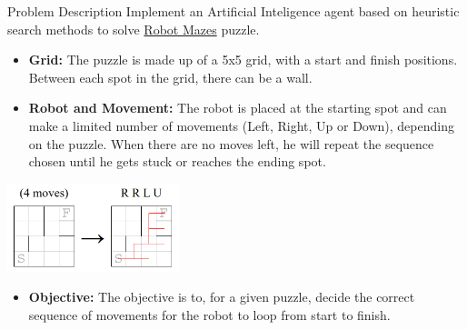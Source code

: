 
\begin{frame}{Problem Description}
    Implement an Artificial Inteligence agent based on heuristic search methods to solve \href{https://erich-friedman.github.io/puzzle/robot/}{Robot Mazes} puzzle. 

    \vspace{0.5em}

    \begin{minipage}{0.62\textwidth}
        \begin{itemize}
            \item \textbf{Grid:} The puzzle is made up of a 5x5 grid, with a start and finish positions. Between each spot in the grid, there can be a wall.
            \item \textbf{Robot and Movement:} The robot is placed at the starting spot and can make a limited number of movements (Left, Right, Up or Down), depending on the puzzle. When there are no moves left, he will repeat the sequence chosen until he gets stuck or reaches the ending spot.
        \end{itemize}
    \end{minipage}%
    \begin{minipage}{0.38\textwidth}
        \includegraphics[width=50mm]{img/puzzle.png}
    \end{minipage}
    \begin{itemize}
            \item \textbf{Objective:} The objective is to, for a given puzzle, decide the correct sequence of movements for the robot to loop from start to finish.
    \end{itemize}
\end{frame}
